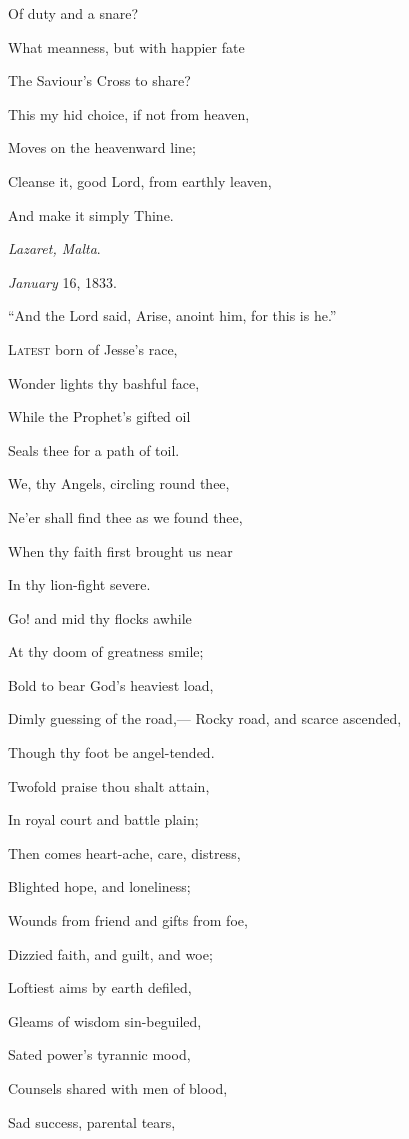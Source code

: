Of duty and a snare?

What meanness, but with happier fate

The Saviour's Cross to share?

This my hid choice, if not from heaven,

Moves on the heavenward line;

Cleanse it, good Lord, from earthly leaven,

And make it simply Thine.

\emph{Lazaret, Malta}.

\emph{January} 16, 1833.


``And the Lord said, Arise, anoint him, for
this is he.''

L\textsc{atest} born of Jesse's race,

Wonder lights thy bashful face,

While the Prophet's gifted oil

Seals thee for a path of toil.

We, thy Angels, circling round thee,

Ne'er shall find thee as we found thee,

When thy faith first brought us near

In thy lion-fight severe.

Go! and mid thy flocks awhile

At thy doom of greatness smile;

Bold to bear God's heaviest load,

Dimly guessing of the road,— Rocky road, and scarce ascended,

Though thy foot be angel-tended.

Twofold praise thou shalt attain,

In royal court and battle plain;

Then comes heart-ache, care, distress,

Blighted hope, and loneliness;

Wounds from friend and gifts from foe,

Dizzied faith, and guilt, and woe;

Loftiest aims by earth defiled,

Gleams of wisdom sin-beguiled,

Sated power's tyrannic mood,

Counsels shared with men of blood,

Sad success, parental tears,


